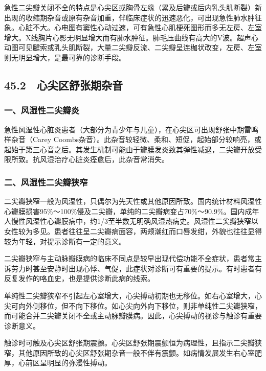 急性二尖瓣关闭不全的特点是心尖区或胸骨左缘（累及后瓣或后内乳头肌断裂）新出现的收缩期杂音或原有杂音加重，伴临床症状的迅速恶化，可出现急性肺水肿征象。心脏不大。心电图有窦性心动过速，可有急性心肌梗死图形而多无左房、左室增大。X线胸片心影无明显增大而有肺水肿征。肺毛压曲线有高大的V波。超声心动图可见腱索或乳头肌断裂，大量二尖瓣反流、二尖瓣呈连枷状改变，左房、左室则无明显增大，是最可靠的诊断手段。

\protect\hypertarget{text00125.html}{}{}

\subsection{45.2　心尖区舒张期杂音}

\subsubsection{一、风湿性二尖瓣炎}

急性风湿性心脏炎患者（大部分为青少年与儿童），在心尖区可出现舒张中期雷鸣样杂音（Carey
Coombs杂音）。此杂音较轻微、柔和、短促，起始部分较响亮，或起始于第三心音之后。其发生机制可能由于瓣膜发炎致其弹性减退，二尖瓣开放受限所致。抗风湿治疗心脏炎痊愈后，此杂音常消失。

\subsubsection{二、风湿性二尖瓣狭窄}

二尖瓣狭窄一般为风湿性，只偶尔为先天性或其他原因所致。国内统计材料风湿性心瓣膜损害95\%～100\%侵及二尖瓣，单纯的二尖瓣病变占70\%～90.9\%。国内成年人慢性风湿性心瓣膜病中，约1/3至半数无明确风湿热病史。风湿性二尖瓣狭窄以女性较为多见。患者往往呈二尖瓣病面容，两颊潮红而口唇发绀，外貌也往往显得较为年轻，对提示诊断有一定的意义。

二尖瓣狭窄与主动脉瓣膜病的临床不同点是较早出现代偿功能不全症状，患者常主诉劳力时甚至安静时出现心悸、气促，此症状对诊断可有重要的提示。有时患者有反复发作的咯血史，也是提供诊断此病的线索。

单纯性二尖瓣狭窄不引起左心室增大，心尖搏动初期也无移位。如右心室增大，心尖可向外侧移位，但不向下移位。如心尖向外向下移位，则非单纯性二尖瓣狭窄，而可能合并二尖瓣关闭不全或主动脉瓣膜病。因此，心尖搏动的视诊与触诊有重要诊断意义。

触诊时可触及心尖区舒张期震颤。心尖区舒张期震颤恒为病理性，且指示二尖瓣狭窄，其他原因所致的心尖区舒张期杂音一般不伴有震颤。如病情发展发生右心室肥厚，心前区呈明显的弥漫性搏动。


